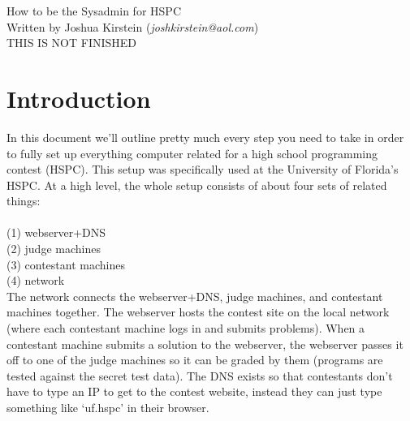 \documentclass[a4paper,11pt]{article}
\begin{document}
\begin{center}
   {\Huge How to be the Sysadmin for HSPC}\vspace{2 mm} \\
   {\large Written by Joshua Kirstein (\emph{joshkirstein@aol.com})} \\
   {\Huge THIS IS NOT FINISHED}
\end{center}

\section{Introduction}
In this document we'll outline pretty much every step you need to take in order to fully set up everything computer related for a high school programming contest (HSPC). This setup was specifically used at the University of Florida's HSPC. At a high level, the whole setup consists of about four sets of related things: \\
\\
(1) webserver+DNS \\
(2) judge machines \\
(3) contestant machines \\
(4) network\\

\noindent
The network connects the webserver+DNS, judge machines, and contestant machines together. The webserver hosts the contest site on the local network (where each contestant machine logs in and submits problems). When a contestant machine submits a solution to the webserver, the webserver passes it off to one of the judge machines so it can be graded by them (programs are tested against the secret test data). The DNS exists so that contestants don't have to type an IP to get to the contest website, instead they can just type something like `uf.hspc' in their browser. 
\end{document}
